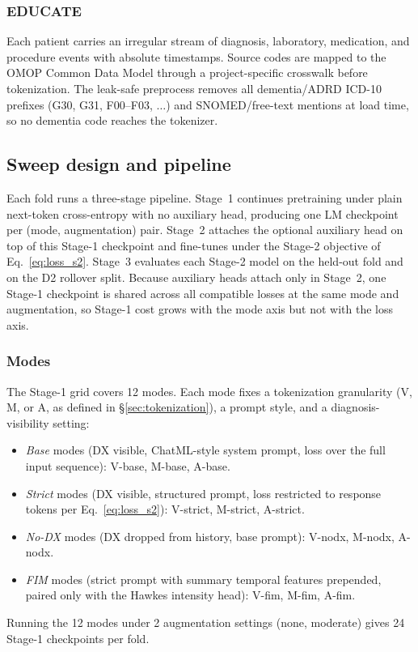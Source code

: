 \documentclass{article}
\begin{document}
\subsubsection{EDUCATE}
Each patient carries an irregular stream of diagnosis, laboratory, medication, and procedure events with absolute timestamps. Source codes are mapped to the OMOP Common Data Model through a project-specific crosswalk before tokenization.
The leak-safe preprocess removes all dementia/ADRD ICD-10 prefixes (G30, G31, F00--F03, $\ldots$) and SNOMED/free-text mentions at load time, so no dementia code reaches the tokenizer.

\subsection{Sweep design and pipeline}
\label{app:sweep}

Each fold runs a three-stage pipeline. Stage~1 continues pretraining under plain next-token cross-entropy with no auxiliary head, producing one LM checkpoint per (mode, augmentation) pair. Stage~2 attaches the optional auxiliary head on top of this Stage-1 checkpoint and fine-tunes under the Stage-2 objective of Eq.~\eqref{eq:loss_s2}. Stage~3 evaluates each Stage-2 model on the held-out fold and on the D2 rollover split. Because auxiliary heads attach only in Stage~2, one Stage-1 checkpoint is shared across all compatible losses at the same mode and augmentation, so Stage-1 cost grows with the mode axis but not with the loss axis.

\subsubsection{Modes}

The Stage-1 grid covers 12 modes. Each mode fixes a tokenization granularity (V, M, or A, as defined in §\ref{sec:tokenization}), a prompt style, and a diagnosis-visibility setting:
\begin{itemize}[leftmargin=*,itemsep=2pt,topsep=2pt]
    \item \emph{Base} modes (DX visible, ChatML-style system prompt, loss over the full input sequence): V-base, M-base, A-base.
    \item \emph{Strict} modes (DX visible, structured prompt, loss restricted to response tokens per Eq.~\eqref{eq:loss_s2}): V-strict, M-strict, A-strict.
    \item \emph{No-DX} modes (DX dropped from history, base prompt): V-nodx, M-nodx, A-nodx.
    \item \emph{FIM} modes (strict prompt with summary temporal features prepended, paired only with the Hawkes intensity head): V-fim, M-fim, A-fim.
\end{itemize}
Running the 12 modes under 2 augmentation settings (none, moderate) gives 24 Stage-1 checkpoints per fold.
\end{document}

